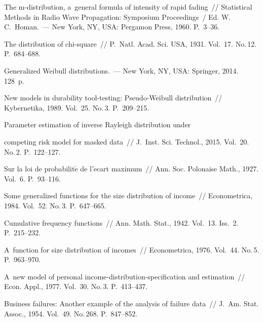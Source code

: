 \begin{multicols}{2}
{{\begin{thebibliography}{99}
The m-distribution, a~general formula of intensity of rapid fading~// 
Statistical Methods in Radio Wave Propagation: Symposium Proceedings~/ 
Ed. W.\,C.~Homan.~--- New York, NY, USA: Pergamon Press, 1960. 
P.~3--36.

The distribution of chi-square~// P.~Natl. Acad. Sci. USA, 1931. 
Vol.~17. No.\,12. P.~684--688.

Generalized Weibull distributions.~--- New York, NY, USA: Springer, 2014. 128~p.

New models in durability tool-testing: Pseudo-Weibull distribution~// 
Kybernetika, 1989. Vol.~25. No.\,3. P.~209--215.

Parameter estimation of inverse Rayleigh distribution under\linebreak\vspace*{-12pt}

\pagebreak

\noindent
  competing risk 
model for masked data~// J.~Inst. Sci. Technol., 2015. Vol.~20. 
No.\,2. P.~122--127.



Sur la loi de probabilit$\acute{\mbox{e}}$ de l'$\acute{\mbox{e}}$cart maximum~// 
Ann. Soc. Polonaise Math., 1927. Vol.~6. P.~93--116.



Some generalized functions for the size distribution of income~// 
Econometrica, 1984. Vol.~52. No.\,3. P.~647--665.

Cumulative frequency functions~// Ann. Math. Stat., 1942. Vol.~13. Iss.~2. P.~215--232.

A~function for size distribution of incomes~// Econometrica, 1976. Vol.~44. No.\,5. P.~963--970.

A~new model of personal income-distribution-specification and estimation~// 
Econ. Appl., 1977. Vol.~30. No.\,3. P.~413--437.

Business failures: Another example of the analysis of failure data~// 
J.~Am. Stat. Assoc., 1954. Vol.~49. No.\,268. 
P.~847--852.
 \end{thebibliography}

 }
 }

\end{multicols}


